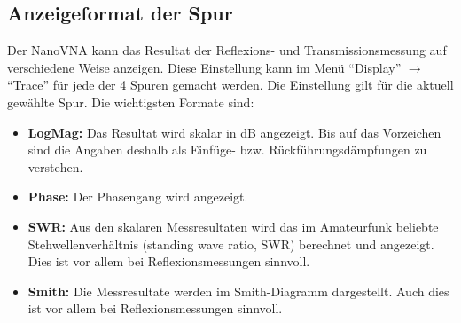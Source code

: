 \documentclass[twoside,a4paper,11pt,halfparskip,DIV=11,notitlepage]{scrartcl}
\begin{document}
\subsection{Anzeigeformat der Spur}\label{sec:nanovnaformat} %
\begin{center}\end{center}

Der NanoVNA kann das Resultat der Reflexions- und Transmissionsmessung auf verschiedene
Weise anzeigen. Diese Einstellung kann im Menü ``Display'' $\longrightarrow$ ``Trace''
für jede der 4 Spuren gemacht werden. Die Einstellung gilt für die aktuell gewählte
Spur. Die wichtigsten Formate sind:

\begin{itemize}
    \item \textbf{LogMag:} Das Resultat wird skalar in dB angezeigt. Bis auf das Vorzeichen sind
        die Angaben deshalb als Einfüge- bzw. Rückführungsdämpfungen zu verstehen.
    \item \textbf{Phase:} Der Phasengang wird angezeigt.
    \item \textbf{SWR:} Aus den skalaren Messresultaten wird das im Amateurfunk
        beliebte Stehwellenverhältnis (standing wave ratio, SWR) berechnet und
        angezeigt. Dies ist vor allem bei Reflexionsmessungen sinnvoll.
    \item \textbf{Smith:} Die Messresultate werden im Smith-Diagramm dargestellt. Auch dies
        ist vor allem bei Reflexionsmessungen sinnvoll.
\end{itemize}
\end{document}
